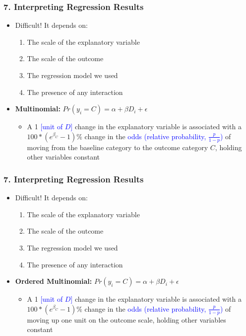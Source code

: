 \documentclass[xcolor=x11names,compress]{beamer}\usepackage[]{graphicx}\usepackage[]{color}
\renewcommand{\(}{\begin{columns}}
\renewcommand{\)}{\end{columns}}
\newcommand{\<}[1]{\begin{column}{#1}}
\renewcommand{\>}{\end{column}}
\begin{document}
\begin{frame}
\frametitle{7. Interpreting Regression Results}
\begin{itemize}
\item Difficult! It depends on:
\begin{enumerate}
\item The scale of the explanatory variable
\item The scale of the outcome
\item The regression model we used
\item The presence of any interaction
\end{enumerate}
\item \textbf{Multinomial:} $Pr(y_i=C) = \alpha + \beta D_i + \epsilon$
\begin{itemize}
\item A 1 \textcolor{blue}{[unit of $D$]} change in the explanatory variable is associated with a $100*(e^{\beta_C}-1)\%$ change in the \textcolor{blue}{odds (relative probability, $\frac{p}{1-p}$)} of moving from the baseline category to the outcome category $C$, holding other variables constant
\end{itemize}
\end{itemize}
\end{frame}

\begin{frame}
\frametitle{7. Interpreting Regression Results}
\begin{itemize}
\item Difficult! It depends on:
\begin{enumerate}
\item The scale of the explanatory variable
\item The scale of the outcome
\item The regression model we used
\item The presence of any interaction
\end{enumerate}
\item \textbf{Ordered Multinomial:} $Pr(y_i=C) = \alpha + \beta D_i + \epsilon$
\begin{itemize}
\item A 1 \textcolor{blue}{[unit of $D$]} change in the explanatory variable is associated with a $100*(e^{\beta_C}-1)\%$ change in the \textcolor{blue}{odds (relative probability, $\frac{p}{1-p}$)} of moving up one unit on the outcome scale, holding other variables constant
\end{itemize}
\end{itemize}
\end{frame}
\end{document}
